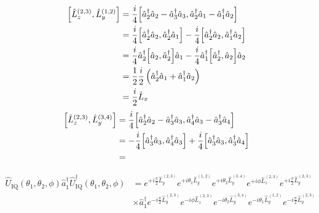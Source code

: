 \begin{equation}
	\begin{split}
		\comm{\hat{L}_z^{(2,3)}}{\hat{L}_y^{(1,2)}}
		&=
		\frac{i}{4}
		\comm{\hat{a}_2^\dagger\hat{a}_2-\hat{a}_3^\dagger\hat{a}_3}{\hat{a}_2^\dagger\hat{a}_1-\hat{a}_1^\dagger\hat{a}_2}
		\\
		&=
		\frac{i}{4}
		\comm{\hat{a}_2^\dagger\hat{a}_2}{\hat{a}_2^\dagger\hat{a}_1}
		-
		\frac{i}{4}
		\comm{\hat{a}_2^\dagger\hat{a}_2}{\hat{a}_1^\dagger\hat{a}_2}
		\\
		&=
		\frac{i}{4}
		\hat{a}_2^\dagger
		\comm{\hat{a}_2}{\hat{a}_2^\dagger}
		\hat{a}_1
		-
		\frac{i}{4}
		\hat{a}_1^\dagger
		\comm{\hat{a}_2^\dagger}{\hat{a}_2}
		\hat{a}_2
		\\
		&=
		\frac{1}{2}
		\frac{i}{2}
		\left(
			\hat{a}_2^\dagger
			\hat{a}_1
			+
			\hat{a}_1^\dagger
			\hat{a}_2
		\right)
		\\
		&=
		\frac{i}{2}\hat{L}_x
	\end{split}
\end{equation}
\begin{equation}
	\begin{split}
		\comm{\hat{L}_z^{(2,3)}}{\hat{L}_y^{(3,4)}}
		&=
		\frac{i}{4}
		\comm{\hat{a}_2^\dagger\hat{a}_2-\hat{a}_3^\dagger\hat{a}_3}{\hat{a}_4^\dagger\hat{a}_3-\hat{a}_3^\dagger\hat{a}_4}
		\\
		&=
		-
		\frac{i}{4}
		\comm{\hat{a}_3^\dagger\hat{a}_3}{\hat{a}_4^\dagger\hat{a}_3}
		+
		\frac{i}{4}
		\comm{\hat{a}_3^\dagger\hat{a}_3}{\hat{a}_3^\dagger\hat{a}_4}
		\\
		&=
	\end{split}
\end{equation}

\begin{equation}
	\begin{split}
		\hat{U}_\text{IQ}(\theta_1,\theta_2,\phi)
		\hat{a}_1^\dagger
		\hat{U}_\text{IQ}^\dagger(\theta_1,\theta_2,\phi)
		&=
		e^{+i\frac{\pi}{2}\hat{L}_y^{(2,3)}}
		e^{+i\theta_1\hat{L}_y^{(1,2)}}
		e^{+i\theta_2\hat{L}_y^{(3,4)}}
		e^{+i\phi\hat{L}_z^{(2,3)}}
		e^{+i\frac{\pi}{2}\hat{L}_y^{(2,3)}}
		\\
		&\times
		\hat{a}_1^\dagger
		e^{-i\frac{\pi}{2}\hat{L}_y^{(2,3)}}
		e^{-i\phi\hat{L}_z^{(2,3)}}
		e^{-i\theta_2\hat{L}_y^{(3,4)}}
		e^{-i\theta_1\hat{L}_y^{(1,2)}}
		e^{-i\frac{\pi}{2}\hat{L}_y^{(2,3)}}
	\end{split}
\end{equation}